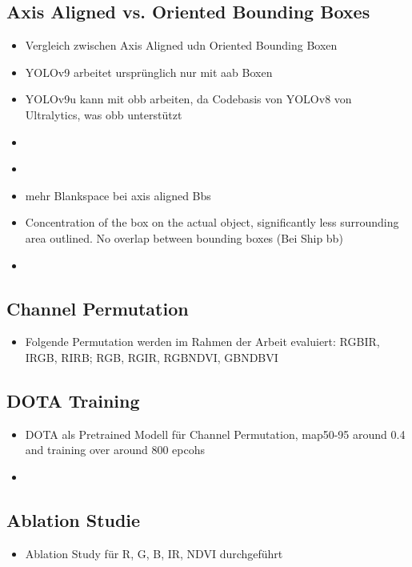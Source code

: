 \subsection{Axis Aligned vs. Oriented Bounding Boxes}
\begin{itemize}
    \item Vergleich zwischen Axis Aligned udn Oriented Bounding Boxen
    \item YOLOv9 arbeitet ursprünglich nur mit aab Boxen
    \item YOLOv9u kann mit obb arbeiten, da Codebasis von YOLOv8 von Ultralytics, was obb unterstützt
    \item 
\end{itemize}
\begin{itemize}
    \item {}
    \item mehr Blankspace bei axis aligned Bbs
    \item Concentration of the box on the actual object, significantly less surrounding area outlined. No overlap between bounding boxes (Bei Ship bb)
    \item 
\end{itemize}
\subsection{Channel Permutation}
\begin{itemize}
    \item Folgende Permutation werden im Rahmen der Arbeit evaluiert: RGBIR, IRGB, RIRB; RGB, RGIR, RGBNDVI, GBNDBVI
\end{itemize}
\subsection{DOTA Training}
\begin{itemize}
    \item DOTA als Pretrained Modell für Channel Permutation, map50-95 around 0.4 and training over around 800 epcohs 
    \item {}
\end{itemize}
\subsection{Ablation Studie}
\begin{itemize}
    \item Ablation Study für R, G, B, IR, NDVI durchgeführt
\end{itemize}


